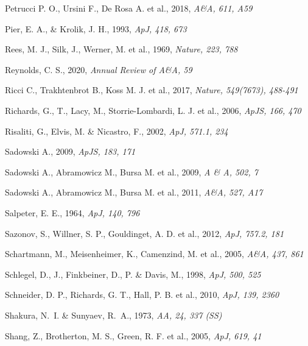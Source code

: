 \documentclass[]{aa}
\begin{document}
\begin{thebibliography}{}
Petrucci P. O., Ursini F., De Rosa A. et al., 2018,
\newblock \emph{A\&A, 611, A59}

Pier, E. A., \& Krolik, J. H., 1993,
\newblock \emph{ApJ, 418, 673}

Rees, M. J., Silk, J., Werner, M. et al., 1969,
\newblock \emph{Nature, 223, 788}

Reynolds, C. S., 2020,
\newblock \emph{Annual Review of A\&A, 59}

Ricci C., Trakhtenbrot B., Koss M. J. et al., 2017,
\newblock \emph{Nature, 549(7673), 488-491}

Richards, G., T., Lacy, M., Storrie-Lombardi, L. J. et al., 2006,
\newblock \emph{ApJS, 166, 470}

Risaliti, G., Elvis, M. \& Nicastro, F., 2002,
\newblock \emph{ApJ, 571.1, 234}

Sadowski A., 2009,
\newblock \emph{ApJS, 183, 171}

Sadowski A., Abramowicz M., Bursa M. et al., 2009,
\newblock \emph{A \& A, 502, 7}

Sadowski A., Abramowicz M., Bursa M. et al., 2011,
\newblock \emph{A\&A, 527, A17}

Salpeter, E. E., 1964,
\newblock \emph{ApJ, 140, 796}

Sazonov, S., Willner, S. P., Gouldinget, A. D. et al., 2012,
\newblock \emph{ApJ, 757.2, 181}

Schartmann, M., Meisenheimer, K., Camenzind, M. et al., 2005,
\newblock \emph{A\&A, 437, 861}

Schlegel, D., J., Finkbeiner, D., P. \& Davis, M., 1998,
\newblock \emph{ApJ, 500, 525}

Schneider, D. P., Richards, G. T., Hall, P. B. et al., 2010, 
\newblock \emph{ApJ, 139, 2360}

Shakura, N.~I. \& Sunyaev, R.~A., 1973,
\newblock \emph{AA, 24, 337 (SS)}

Shang, Z., Brotherton, M. S., Green, R. F. et al., 2005,
\newblock \emph{ApJ, 619, 41}


\end{thebibliography}
\end{document}
